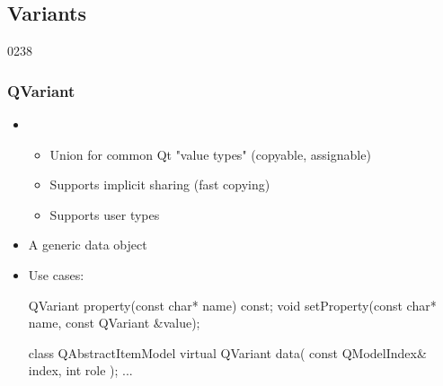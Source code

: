%
%
%
%

\subsection{Variants}

\begin{slide}[fragile]{0238}\frametitle{QVariant}
\begin{itemize}
  \item {} 
  \begin{itemize}
    \item Union for common Qt "value types" (copyable, assignable)
    \item Supports implicit sharing (fast copying)
    \item Supports user types
  \end{itemize}\medskip
\item A generic data object
\item Use cases:
\begin{cpp}
QVariant property(const char* name) const;
void setProperty(const char* name, const QVariant &value);
\end{cpp}\medskip

\begin{cpp}
class QAbstractItemModel {
  virtual QVariant data( const QModelIndex& index, int role );
  ...
}
\end{cpp}
\end{itemize}
\end{slide}

